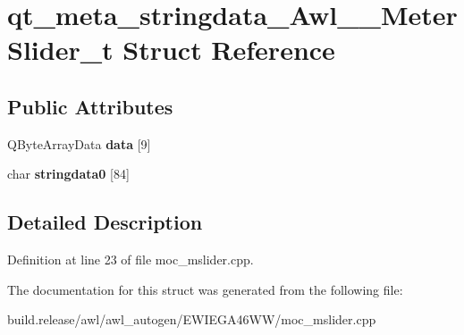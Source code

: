\hypertarget{structqt__meta__stringdata___awl_____meter_slider__t}{}\section{qt\+\_\+meta\+\_\+stringdata\+\_\+\+Awl\+\_\+\+\_\+\+Meter\+Slider\+\_\+t Struct Reference}
\label{structqt__meta__stringdata___awl_____meter_slider__t}
\subsection*{Public Attributes}
\begin{DoxyCompactItemize}
\item 
\mbox{\label{structqt__meta__stringdata___awl_____meter_slider__t_afb6436f522f0a1669e817dfce77e9821}} 
Q\+Byte\+Array\+Data {\bfseries data} \mbox{[}9\mbox{]}
\item 
\mbox{\label{structqt__meta__stringdata___awl_____meter_slider__t_aa81491c78496c441d8d6b836a691e528}} 
char {\bfseries stringdata0} \mbox{[}84\mbox{]}
\end{DoxyCompactItemize}


\subsection{Detailed Description}


Definition at line 23 of file moc\+\_\+mslider.\+cpp.



The documentation for this struct was generated from the following file\+:\begin{DoxyCompactItemize}
\item 
build.\+release/awl/awl\+\_\+autogen/\+E\+W\+I\+E\+G\+A46\+W\+W/moc\+\_\+mslider.\+cpp\end{DoxyCompactItemize}
